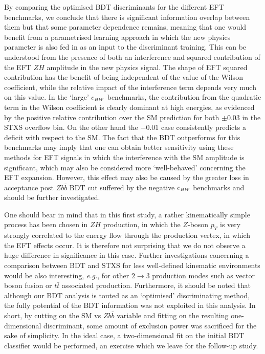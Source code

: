 By comparing the optimised BDT discriminants for the different EFT benchmarks, we conclude that there is significant information overlap between them but that some parameter dependence remains, meaning that one would benefit from a parametrised learning approach in which the new physics parameter is also fed in as an input to the discriminant training. This can be understood from the presence of both an interference and squared contribution of the EFT $ZH$ amplitude in the new physics signal. The shape of EFT squared contribution has the benefit of being independent of the value of the Wilson coefficient, while the relative impact of the interference term depends very much on this value. In the `large' $c_{\scriptscriptstyle HW}$ benchmarks, the contribution from the quadratic term in the Wilson coefficient is clearly dominant at high energies, as evidenced by the positive relative contribution over the SM prediction for both $\pm0.03$ in the STXS overflow bin. On the other hand the $-0.01$ case consistently predicts a deficit with respect to the SM. The fact that the BDT outperforms for this benchmarks may imply that one can obtain better sensitivity using these methods for EFT signals in which the interference with the SM amplitude is significant, which may also be considered more `well-behaved' concerning the EFT expansion. However, this effect may also be caused by the greater loss in acceptance post $Zb\bar{b}$ BDT cut suffered by the negative $c_{\scriptscriptstyle HW}$ benchmarks and should be further investigated.

One should bear in mind that in this first study, a rather kinematically simple process has been chosen in $ZH$ production, in which the $Z$-boson $p_T$ is very strongly correlated to the energy flow through the production vertex, in which the EFT effects occur. It is therefore not surprising that we do not observe a huge difference in significance in this case. Further investigations concerning a comparison between BDT and STXS for less well-defined kinematic environments would be also interesting, \emph{e.g.}, for other $2\to3$ production modes such as vector boson fusion or $t\bar{t}$ associated production.  Furthermore, it should be noted that although our BDT analysis is touted as an `optimised' discriminating method, the fully potential of the BDT information was not exploited in this analysis. In short, by cutting on the SM vs $Zb\bar{b}$ variable and fitting on the resulting one-dimensional discriminant, some amount of exclusion power was sacrificed for the sake of simplicity. In the ideal case, a two-dimensional fit on the initial BDT classifier would be performed, an exercise which we leave for the follow-up study.
